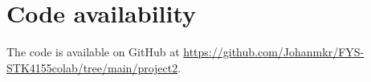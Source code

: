 

%


\section*{Code availability}
The code is available on GitHub at \url{https://github.com/Johanmkr/FYS-STK4155colab/tree/main/project2}.


% 


